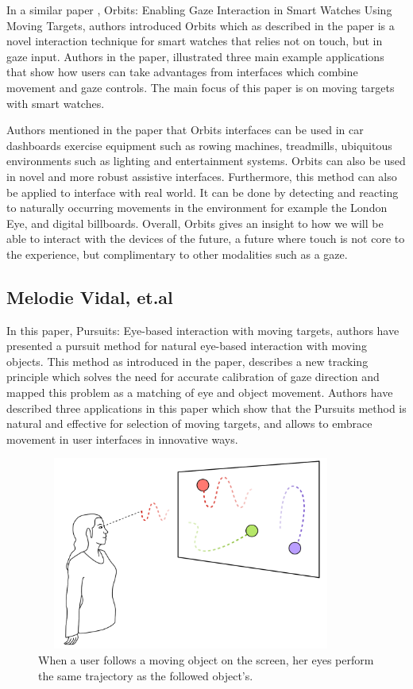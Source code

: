 In a similar paper \cite{19}, Orbits: Enabling Gaze Interaction in Smart Watches Using Moving Targets, authors introduced Orbits which as described in the paper is a novel interaction technique for smart watches that relies not on touch, but in gaze input. Authors in the paper, illustrated three main example applications that show how users can take advantages from interfaces which combine movement and gaze controls. The main focus of this paper is on moving targets with smart watches.

Authors mentioned in the paper that Orbits interfaces can be used in car dashboards exercise equipment such as rowing machines, treadmills, ubiquitous environments such as lighting and entertainment systems. Orbits can also be used in novel and more robust assistive interfaces. Furthermore, this method can also be applied to interface with real world. It can be done by detecting and reacting to naturally occurring movements in the environment for example the London Eye, and digital billboards. Overall, Orbits gives an insight to how we will be able to interact with the devices of the future, a future where touch is not core to the experience, but complimentary to other modalities such as a gaze.


\subsection{Melodie Vidal, et.al \cite{6}}

In this paper, Pursuits: Eye-based interaction with moving targets, authors have presented a pursuit method for natural eye-based interaction with moving objects. This method as introduced in the paper, describes a new tracking principle which solves the need for accurate calibration of gaze direction and mapped this problem as a matching of eye and object movement. Authors have described three applications in this paper which show that the Pursuits method is natural and effective for selection of moving targets, and allows to embrace movement in user interfaces in innovative ways. 

\begin{figure}[!hbt]
  \centering
  \includegraphics[width=4in,height=2.5in]{melodie.png}
  \caption{When a user follows a moving object on the screen, her eyes perform the same trajectory as the followed object’s.}
  \label{melodie}
\end{figure}

